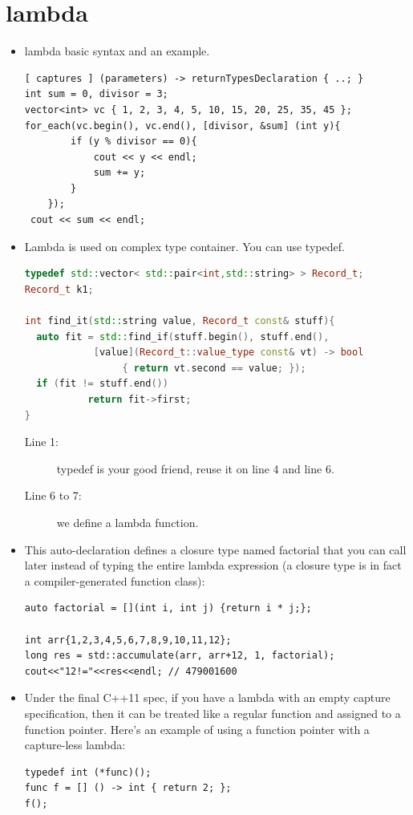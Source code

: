 \documentclass[a4paper,11pt,twoside]{book}
\begin{document}
\section{lambda}

\begin{itemize}
\item lambda basic syntax and an example.
\begin{lstlisting}[numbers=none]
[ captures ] (parameters) -> returnTypesDeclaration { ..; }
int sum = 0, divisor = 3;
vector<int> vc { 1, 2, 3, 4, 5, 10, 15, 20, 25, 35, 45 };
for_each(vc.begin(), vc.end(), [divisor, &sum] (int y){
		if (y % divisor == 0){
			cout << y << endl;
			sum += y;
		}
	});
 cout << sum << endl;
\end{lstlisting}

\item Lambda is used on complex type container. You can use typedef.
\begin{lstlisting}[frame=single, language=c++, mathescape=true]
typedef std::vector< std::pair<int,std::string> > Record_t;
Record_t k1;

int find_it(std::string value, Record_t const& stuff){
  auto fit = std::find_if(stuff.begin(), stuff.end(),
            [value](Record_t::value_type const& vt) -> bool
                 { return vt.second == value; });
  if (fit != stuff.end())
           return fit->first;
}
\end{lstlisting}
\begin{description}
	\item[Line 1:] typedef is your good friend, reuse it on line 4 and line 6.
	\item[Line 6 to 7:] we define a lambda function.
\end{description}
\item This auto-declaration defines a closure type named factorial that you can call later instead of typing the entire lambda expression (a closure type is in fact a compiler-generated function class):
\begin{lstlisting}[numbers=none]
auto factorial = [](int i, int j) {return i * j;};

int arr{1,2,3,4,5,6,7,8,9,10,11,12};
long res = std::accumulate(arr, arr+12, 1, factorial);
cout<<"12!="<<res<<endl; // 479001600
\end{lstlisting}

\item Under the final C++11 spec, if you have a lambda with an empty capture specification, then it can be treated like a regular function and assigned to a function pointer. Here's an example of using a function pointer with a capture-less lambda:
\begin{lstlisting}[numbers=none]
typedef int (*func)();
func f = [] () -> int { return 2; };
f();
\end{lstlisting}


\end{itemize}
\end{document}

